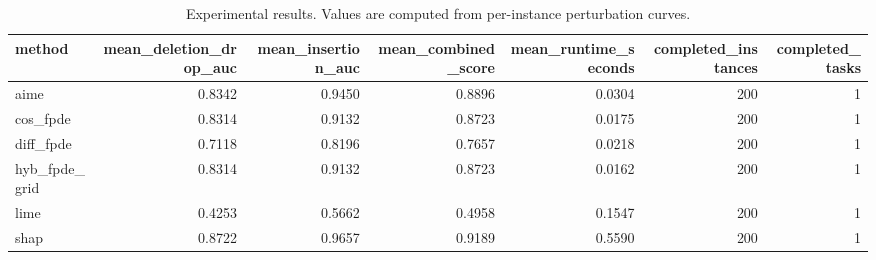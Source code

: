 \begin{table}[t]
\caption{Experimental results. Values are computed from per-instance perturbation curves.}
\label{tab:main_results_computed}
\centering
\begin{tabular}{lrrrrrr}
\toprule
method & mean\_deletion\_drop\_auc & mean\_insertion\_auc & mean\_combined\_score & mean\_runtime\_seconds & completed\_instances & completed\_tasks \\
\midrule
aime & 0.8342 & 0.9450 & 0.8896 & 0.0304 & 200 & 1 \\
cos\_fpde & 0.8314 & 0.9132 & 0.8723 & 0.0175 & 200 & 1 \\
diff\_fpde & 0.7118 & 0.8196 & 0.7657 & 0.0218 & 200 & 1 \\
hyb\_fpde\_grid & 0.8314 & 0.9132 & 0.8723 & 0.0162 & 200 & 1 \\
lime & 0.4253 & 0.5662 & 0.4958 & 0.1547 & 200 & 1 \\
shap & 0.8722 & 0.9657 & 0.9189 & 0.5590 & 200 & 1 \\
\bottomrule
\end{tabular}

\end{table}
